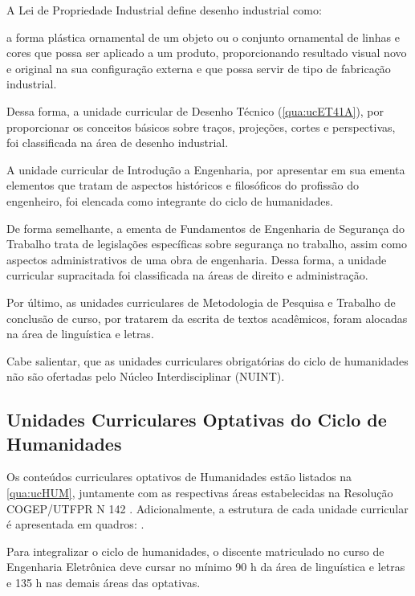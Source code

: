 A Lei de Propriedade Industrial define desenho industrial como:

\begin{citacao}
	a forma plástica ornamental de um objeto ou o conjunto ornamental de linhas e cores que possa ser aplicado a um produto, proporcionando resultado visual novo e original na sua configuração externa e que possa servir de tipo de fabricação industrial.
\end{citacao}

Dessa forma, a unidade curricular de Desenho Técnico (\autoref{qua:ucET41A}), por proporcionar os conceitos básicos sobre traços, projeções, cortes e perspectivas, foi classificada na área de desenho industrial.

A unidade curricular de Introdução a Engenharia, por apresentar em sua ementa elementos que tratam de aspectos históricos e filosóficos do profissão do engenheiro, foi elencada como integrante do ciclo de humanidades.

De forma semelhante, a ementa de Fundamentos de Engenharia de Segurança do Trabalho trata de legislações específicas sobre segurança no trabalho, assim como aspectos administrativos de uma obra de engenharia. Dessa forma, a unidade curricular supracitada foi classificada na áreas de direito e administração.

Por último, as unidades curriculares de Metodologia de Pesquisa e Trabalho de conclusão de curso, por tratarem da escrita de textos acadêmicos, foram alocadas na área de linguística e letras.

Cabe salientar, que as unidades curriculares obrigatórias do ciclo de humanidades não são ofertadas pelo Núcleo Interdisciplinar (NUINT).



\subsection{Unidades Curriculares Optativas do Ciclo de Humanidades}
\label{subsec:opthumanidades}

Os conteúdos curriculares optativos de Humanidades estão listados na \autoref{qua:ucHUM}, juntamente com as respectivas áreas estabelecidas na Resolução COGEP/UTFPR N\textordmasculine{} 142 \cite{cogep142}. Adicionalmente, a estrutura de cada unidade curricular é apresentada em quadros: .

Para integralizar o ciclo de humanidades, o discente matriculado no curso de Engenharia Eletrônica deve cursar no mínimo 90 h da área de linguística e letras e 135 h nas demais áreas das optativas.

